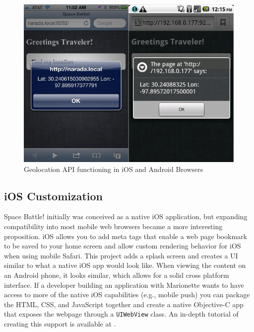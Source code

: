 \documentclass[12pt]{report}	%
\theoremstyle{definition}
\theoremstyle{remark}
\begin{document}
\begin{figure}[h!]
\centering
\includegraphics[scale=0.6]{1.png}
\caption{Geolocation API functioning in iOS and Android Browsers}
\label{geoloc}
\end{figure}

\subsection{iOS Customization}

Space Battle! initially was conceived as a native iOS application, but
expanding compatibility into most mobile web browsers became a more
interesting proposition. iOS allows you to add meta tags that enable
a web page bookmark to be saved to your home screen and allow custom rendering
behavior for iOS when using mobile Safari. This project adds a splash
screen and creates a UI similar to what a native iOS app would look
like. When viewing the content on an Android phone, it looks similar,
which allows for a solid cross platform interface. If a developer building 
an application with Marionette wants to have
access to more of the native iOS capabilities (e.g., mobile push) you can
package the HTML, CSS, and JavaScript together and create a native
Objective-C app that exposes the webpage through a
\texttt{UIWebView} class. An in-depth tutorial of
creating this support is available at \cite{mightios}.
\end{document}
